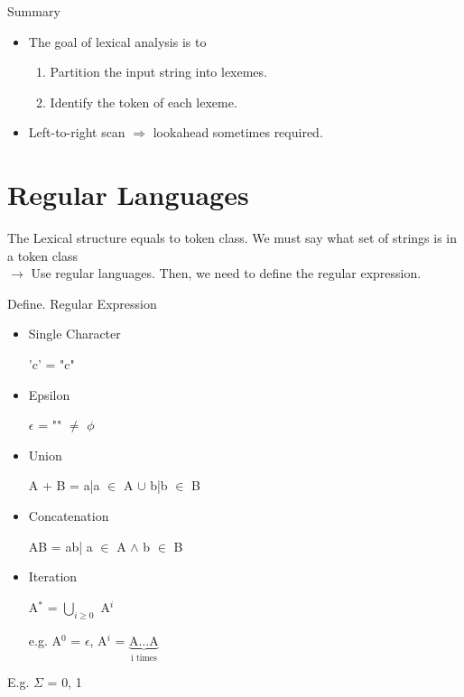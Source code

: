 \documentclass[11pt]{report}
\newenvironment{cell}{%
	\tcolorbox[blanker,breakable,left=5mm,
	before skip=10pt,after skip=10pt,
	borderline west={1mm}{0pt}{stanfordred}]
}%
{\endtcolorbox}
\begin{document}
\begin{cell}
    \textcolor{stanfordred}{Summary} 

    \begin{itemize}
        \item The goal of lexical analysis is to
        \begin{enumerate}
            \item Partition the input string into lexemes.
            \item Identify the token of each lexeme.
        \end{enumerate}
        \item Left-to-right scan \(\Rightarrow\) lookahead sometimes required.
    \end{itemize}
\end{cell}

\section{Regular Languages}
The \textcolor{stanfordred}{Lexical structure} equals to \textcolor{stanfordred}{token class}.
We must say what set of strings is in a token class\\
\(\rightarrow\) Use regular languages. Then, we need to define the regular expression.

\begin{cell}
    \textcolor{stanfordred}{Define.} Regular Expression
    \begin{itemize}
        \item Single Character
        \begin{code}
            'c' = {"c"}
        \end{code}
        \item Epsilon
        \begin{code}
            $\epsilon$ = {""} $\neq$ $\phi$
        \end{code}
        \item Union
        \begin{code}
            A + B = {a|a $\in$ A} $\cup$ {b|b $\in$ B}
        \end{code}
        \item Concatenation
        \begin{code}
            AB = {ab| a $\in$ A $\wedge$ b $\in$ B}
        \end{code}
        \item Iteration
        \begin{code}
            A$^*$ = $\displaystyle\bigcup_{i\geq0}$ A$^i$
        \end{code} 
        \begin{code}
            e.g. A$^0$ = $\epsilon$, A$^i$ = $\underbrace{\text{A}\dots \text{A}}_{\text{i times}}$
        \end{code}
    \end{itemize}
\end{cell}
E.g. \quad $\Sigma$ = {0, 1}
\end{document}
